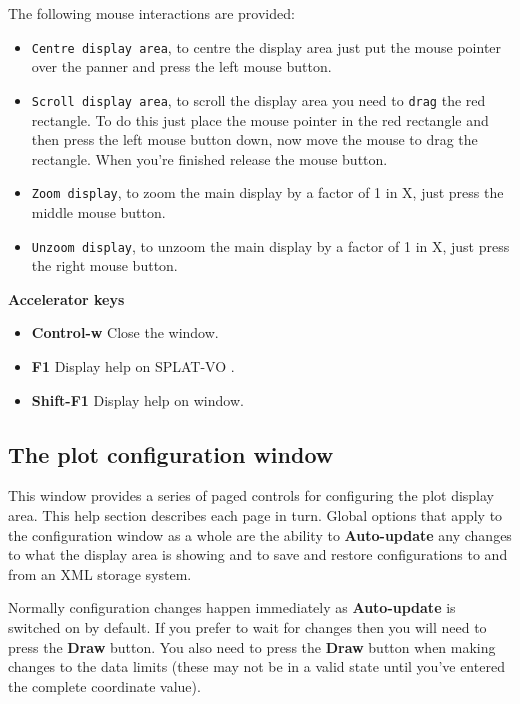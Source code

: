 \documentclass[twoside,11pt,nolof]{starlink}
\providecommand{\SPLAT}{\textsf{SPLAT-VO }}
\newcommand{\labelitem}[1]{\textbf{#1}}
\providecommand{\hitext}[1]{\texttt{#1}}
\providecommand{\subheading}[1]{\textbf{\large{#1}}}
\begin{document}
The following mouse interactions are provided:
\begin{itemize}

 \item \hitext{Centre display area}, to centre the display area just
 put the mouse pointer over the panner and press the left mouse
 button.

 \item \hitext{Scroll display area}, to scroll the display area you
 need to \hitext{drag} the red rectangle. To do this just place the
 mouse pointer in the red rectangle and then press the left mouse
 button down, now move the mouse to drag the rectangle. When you're
 finished release the mouse button.

 \item \hitext{Zoom display}, to zoom the main display by a factor of
 1 in X, just press the middle mouse button.

 \item \hitext{Unzoom display}, to unzoom the main display by a factor
 of 1 in X, just press the right mouse button.

\end{itemize}

\subheading{Accelerator keys}

\begin{itemize}
\item \labelitem{Control-w} Close the window.
\item \labelitem{F1} Display help on \SPLAT.
\item \labelitem{Shift-F1} Display help on window.
\end{itemize}

\newpage
\subsection{The plot configuration window}

This window provides a series of paged controls for configuring the
plot display area. This help section describes each page in
turn. Global options that apply to the configuration window as a whole
are the ability to \labelitem{Auto-update} any changes to what the
display area is showing and to save and restore configurations to and
from an XML storage system.

Normally configuration changes happen immediately as \labelitem{Auto-update}
is switched on by default. If you prefer to wait for changes then you will
need to press the \labelitem{Draw} button. You also need to press the
\labelitem{Draw} button when making changes to the data limits (these may not
be in a valid state until you've entered the complete coordinate value).
\end{document}
